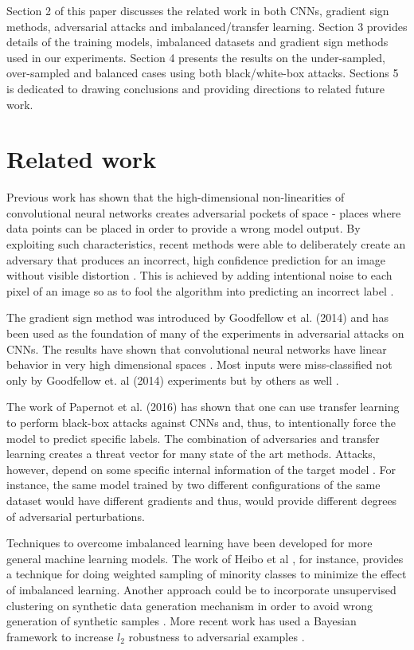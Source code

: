 \documentclass[runningheads,a4paper]{llncs}
\begin{document}
Section 2 of this paper discusses the related work in both CNNs, gradient sign methods, adversarial attacks and imbalanced/transfer learning. Section 3 provides details of the training models, imbalanced datasets and gradient sign methods used in our experiments. Section 4 presents the results on the under-sampled, over-sampled and balanced cases using both black/white-box attacks. Sections 5 is dedicated to drawing conclusions and providing directions to related future work.
\section{Related work}


Previous work has shown that the high-dimensional non-linearities of convolutional neural networks \cite{lawrence1997face} creates adversarial pockets of space - places where data points can be placed in order to provide a wrong model output. By exploiting such characteristics, recent methods were able to deliberately create an adversary that produces an incorrect, high confidence prediction for an image without visible distortion \cite{papernot_thesis_2016}. This is achieved by adding intentional noise to each pixel of an image so as to fool the algorithm into predicting an incorrect label \cite{goodfellow2014,papernot2016transf,szegedy2013}.

The gradient sign method was introduced by Goodfellow et al. (2014) and has been used as the foundation of many of the experiments in adversarial attacks on CNNs. The results have shown that convolutional neural networks have linear behavior in very high dimensional spaces \cite{goodfellow2014}.  Most inputs were miss-classified not only by Goodfellow et. al (2014) experiments but by others as well \cite{billovits,papernot2016}.

The work of Papernot et al. (2016) has shown that one can use transfer learning to perform black-box attacks against CNNs \cite{papernot2016transf,yosinski2014transferable} and, thus, to intentionally force the model to predict specific labels. The combination of adversaries and transfer learning creates a threat vector for many state of the art methods. Attacks, however, depend on some specific internal information of the target model \cite{lowd2005,papernot2016transf}. For instance, the same model trained by two different configurations of the same dataset would have different gradients and thus, would provide different degrees of adversarial perturbations.

Techniques to overcome imbalanced learning have been developed for more general machine learning models. The work of Heibo et al \cite{he2008adasyn}, for instance, provides a technique for doing weighted sampling of minority classes to minimize the effect of imbalanced learning. Another approach could be to incorporate unsupervised clustering on synthetic data generation mechanism in order to avoid wrong generation of synthetic samples \cite{Barua2011}. More recent work has used a Bayesian framework to increase $l_2$ robustness to adversarial examples \cite{billovits}.
\end{document}
